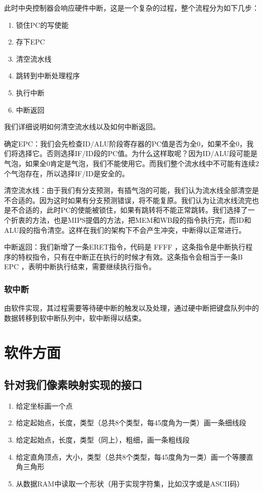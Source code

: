 此时中央控制器会响应硬件中断，这是一个复杂的过程，整个流程分为如下几步：

\begin{enumerate}
    \item 锁住PC的写使能
    \item 存下EPC
    \item 清空流水线
    \item 跳转到中断处理程序
    \item 执行中断
    \item 中断返回
\end{enumerate}

我们详细说明如何清空流水线以及如何中断返回。

确定EPC：我们会先检查ID/ALU阶段寄存器的PC值是否为全0，如果不全0，我们将选择它。否则选择IF/ID段的PC值。为什么这样取呢？因为ID/ALU段可能是气泡，如果全0肯定是气泡，我们不能使用它。而我们整个流水线中不可能有连续2个气泡存在，所以选择IF/ID是安全的。

清空流水线：由于我们有分支预测，有插气泡的可能，我们认为流水线全部清空是不合适的。因为这时如果有分支预测错误，将不能复原。我们认为让流水线流完也是不合适的，此时PC的使能被锁住，如果有跳转将不能正常跳转。我们选择了一个折衷的方法，也是MIPS提倡的方法，把MEM和WB段的指令执行完，而ID和ALU段的指令清空。这样在我们的架构下不会产生冲突，中断得以正常进行。

中断返回：我们新增了一条ERET指令，代码是  FFFF  ，这条指令是中断执行程序的特权指令，只有在中断正在执行的时候才有效。这条指令会相当于一条B  EPC  ，表明中断执行结束，需要继续执行指令。

\subsubsection{软中断}
由软件实现，其过程需要等待硬中断的触发以及处理，通过硬中断把键盘队列中的数据转移到软中断队列中，软中断得以结束。

\section{软件方面}

\subsection{针对我们像素映射实现的接口}

\begin{enumerate}
    \item 给定坐标画一个点
    \item 给定起始点，长度，类型（总共8个类型，每45度角为一类）画一条细线段
    \item 给定起始点，长度，类型（同上），粗细，画一条粗线段
    \item 给定直角顶点，大小，类型（总共8个类型，每45度角为一类）画一个等腰直角三角形
    \item 从数据RAM中读取一个形状（用于实现字符集，比如汉字或是ASCII码）
\end{enumerate}




